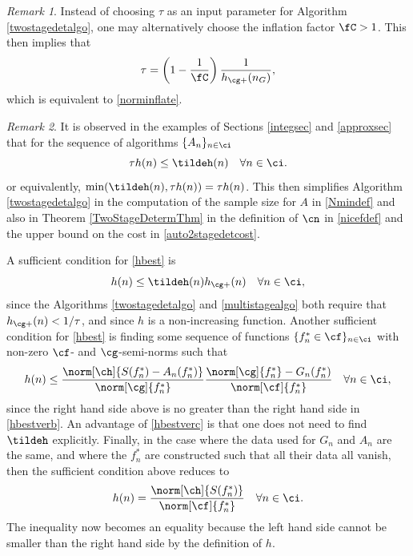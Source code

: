 \documentclass[]{elsarticle}
\theoremstyle{definition}
\theoremstyle{remark}
\newtheorem{rem}{Remark}
\begin{document}
\begin{rem} Instead of choosing $\tau$ as an input parameter for Algorithm \ref{twostagedetalgo}, one may alternatively choose the inflation factor $\fC >1$.  This then implies that 
\begin{equation} \label{taufromnC}
\tau = \left(1 - \frac{1}{\fC}\right)\frac{1}{h_{\cg+}(n_G)},
\end{equation}
which is equivalent to \eqref{norminflate}.
\end{rem}

\begin{rem} It is observed in the examples of Sections \ref{integsec} and \ref{approxsec} that for the sequence of algorithms $\{A_n\}_{n \in \ci}$
\begin{equation} \label{hbest}
\tau h(n) \le \tildeh(n) \quad \forall n \in \ci.
\end{equation}
or equivalently, $\min(\tildeh(n),\tau h(n))=\tau h(n)$.  This then simplifies Algorithm \ref{twostagedetalgo} in the computation of the sample size for $A$ in \eqref{Nmindef} and also in Theorem \ref{TwoStageDetermThm} in the definition of $\cn$ in \eqref{nicefdef} and the upper bound on the cost in \eqref{auto2stagedetcost}. 

A sufficient condition for \eqref{hbest} is
\begin{equation} \label{hbestverb}
h(n) \le \tildeh(n) h_{\cg+}(n) \quad \forall n \in \ci,
\end{equation}
since the Algorithms \ref{twostagedetalgo} and \ref{multistagealgo} both require that $h_{\cg+}(n) < 1/\tau$, and since $h$ is a non-increasing function.   Another 
sufficient condition for \eqref{hbest} is finding some sequence of functions $\{f^*_n \in \cf\}_{n \in \ci}$ with non-zero $\cf$- and $\cg$-semi-norms such that 
\begin{equation} \label{hbestverc}
h(n) \le \frac{\norm[\ch]{S(f^*_n)-A_n(f_n^*)}}{\norm[\cg]{f_n^*}} \frac{\norm[\cg]{f^*_n}-G_n(f^*_n)}{\norm[\cf]{f^*_n}}   \quad \forall n \in \ci,
\end{equation}
since the right hand side above is no greater than the right hand side in \eqref{hbestverb}. An advantage of \eqref{hbestverc} is that one does not need to find $\tildeh$ explicitly. Finally, in the case where the data used for $G_n$ and $A_n$ are the same, and where the $f^*_n$ are constructed such that all their data all vanish, then the sufficient condition above reduces to 
\begin{equation} \label{hbestverd}
h(n) = \frac{\norm[\ch]{S(f^*_n)}}{\norm[\cf]{f^*_n}}   \quad \forall n \in \ci.
\end{equation}
The inequality now becomes an equality because the left hand side cannot be smaller than the right hand side by the definition of $h$.
\end{rem}
\end{document}

